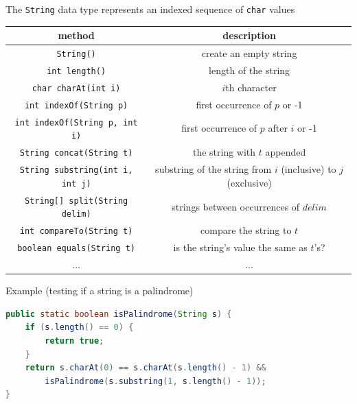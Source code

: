 \documentclass[8pt,a4paper,compress]{beamer}
\begin{document}
\begin{frame}[fragile]
\pause
The \lstinline{String} data type represents an indexed sequence of \lstinline{char} values

\begin{center}
\begin{tabular}{cc}
method & description \\ \hline
\lstinline$String()$ & create an empty string \\
\lstinline$int length()$ & length of the string \\
\lstinline$char charAt(int i)$ & $i$th character \\
\lstinline$int indexOf(String p)$ & first occurrence of $p$ or -1 \\ \lstinline$int indexOf(String p, int i)$ & first occurrence of $p$ after $i$ or -1 \\
\lstinline$String concat(String t)$ & the string with $t$ appended \\
\lstinline$String substring(int i, int j)$ & \makecell{substring of the string from $i$ (inclusive) \\ to $j$ (exclusive)} \\
\lstinline$String[] split(String delim)$ & strings between occurrences of $delim$ \\
\lstinline$int compareTo(String t)$ & compare the string to $t$ \\
\lstinline$boolean equals(String t)$ & is the string's value the same as $t$'s? \\
$\dots$ & $\dots$
\end{tabular} 
\end{center}

\pause\bigskip

Example (testing if a string is a palindrome)

\smallskip

\begin{lstlisting}[language=Java,style=focusin]
public static boolean isPalindrome(String s) {
    if (s.length() == 0) {
        return true;
    } 
    return s.charAt(0) == s.charAt(s.length() - 1) && 
        isPalindrome(s.substring(1, s.length() - 1));
}
\end{lstlisting}
\end{frame}
\end{document}
